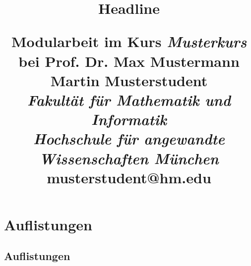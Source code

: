 

\posttitle{\end{center}}

\pagestyle{scrheadings}
\chead{\headmark} %
\overfullrule=3pt


\title{\textbf{Headline} \\ 
	\begin{small}
		\vspace{3mm}
		Modularbeit im Kurs \textit{Musterkurs} bei Prof. Dr. Max Mustermann\\
		\vspace{3mm}		
		Martin Musterstudent \\
		\textit{Fakultät für Mathematik und Informatik} \\
		\textit{Hochschule für angewandte Wissenschaften München}\\
		musterstudent@hm.edu \\
	\end{small}
}

\date{}

\maketitle



\vspace{-40mm}

\section{Auflistungen}

\subsection{Auflistungen}


